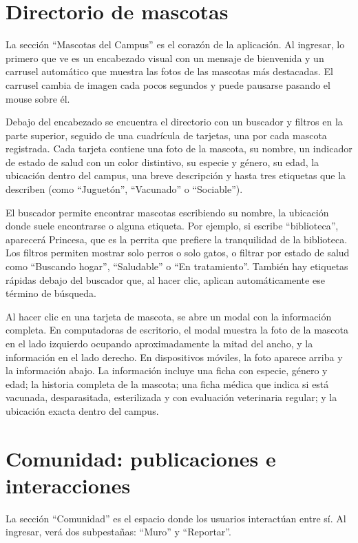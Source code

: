 \documentclass[12pt,a4paper]{article}
\begin{document}
\section{Directorio de mascotas}

La sección ``Mascotas del Campus'' es el corazón de la aplicación. Al ingresar, lo primero que ve es un encabezado visual con un mensaje de bienvenida y un carrusel automático que muestra las fotos de las mascotas más destacadas. El carrusel cambia de imagen cada pocos segundos y puede pausarse pasando el mouse sobre él.

Debajo del encabezado se encuentra el directorio con un buscador y filtros en la parte superior, seguido de una cuadrícula de tarjetas, una por cada mascota registrada. Cada tarjeta contiene una foto de la mascota, su nombre, un indicador de estado de salud con un color distintivo, su especie y género, su edad, la ubicación dentro del campus, una breve descripción y hasta tres etiquetas que la describen (como ``Juguetón'', ``Vacunado'' o ``Sociable'').

El buscador permite encontrar mascotas escribiendo su nombre, la ubicación donde suele encontrarse o alguna etiqueta. Por ejemplo, si escribe ``biblioteca'', aparecerá Princesa, que es la perrita que prefiere la tranquilidad de la biblioteca. Los filtros permiten mostrar solo perros o solo gatos, o filtrar por estado de salud como ``Buscando hogar'', ``Saludable'' o ``En tratamiento''. También hay etiquetas rápidas debajo del buscador que, al hacer clic, aplican automáticamente ese término de búsqueda.

Al hacer clic en una tarjeta de mascota, se abre un modal con la información completa. En computadoras de escritorio, el modal muestra la foto de la mascota en el lado izquierdo ocupando aproximadamente la mitad del ancho, y la información en el lado derecho. En dispositivos móviles, la foto aparece arriba y la información abajo. La información incluye una ficha con especie, género y edad; la historia completa de la mascota; una ficha médica que indica si está vacunada, desparasitada, esterilizada y con evaluación veterinaria regular; y la ubicación exacta dentro del campus.

\section{Comunidad: publicaciones e interacciones}

La sección ``Comunidad'' es el espacio donde los usuarios interactúan entre sí. Al ingresar, verá dos subpestañas: ``Muro'' y ``Reportar''.
\end{document}
